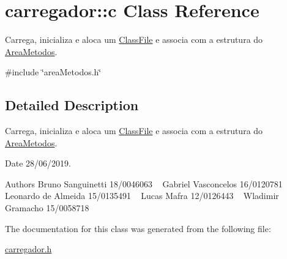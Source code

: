 \hypertarget{classcarregador_1_1c}{}\section{carregador\+::c Class Reference}
\label{classcarregador_1_1c}


Carrega, inicializa e aloca um \mbox{\hyperlink{structClassFile}{Class\+File}} e associa com a estrutura do \mbox{\hyperlink{structAreaMetodos}{Area\+Metodos}}.  




{\ttfamily \#include \char`\"{}area\+Metodos.\+h\char`\"{}}



\subsection{Detailed Description}
Carrega, inicializa e aloca um \mbox{\hyperlink{structClassFile}{Class\+File}} e associa com a estrutura do \mbox{\hyperlink{structAreaMetodos}{Area\+Metodos}}. 

\begin{DoxyDate}{Date}
28/06/2019.
\end{DoxyDate}
\begin{DoxyAuthor}{Authors}
Bruno Sanguinetti 18/0046063 ~\newline
Gabriel Vasconcelos 16/0120781 ~\newline
Leonardo de Almeida 15/0135491 ~\newline
Lucas Mafra 12/0126443 ~\newline
Wladimir Gramacho 15/0058718 ~\newline

\end{DoxyAuthor}


The documentation for this class was generated from the following file\+:\begin{DoxyCompactItemize}
\item 
\mbox{\hyperlink{carregador_8h}{carregador.\+h}}\end{DoxyCompactItemize}
